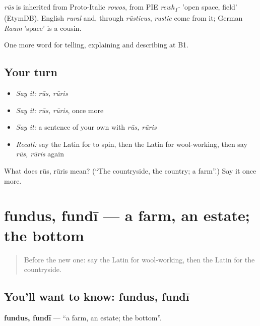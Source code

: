\begin{cousinweb}
\emph{rūs} is inherited from Proto-Italic \emph{rowos}, from PIE \emph{rewh\textsubscript{1}-} 'open space, field' (EtymDB). English \emph{rural} and, through \emph{rūsticus}, \emph{rustic} come from it; German \emph{Raum} 'space' is a cousin.
\end{cousinweb}

\begin{grammarlens}[title={What you've built}]
One more word for telling, explaining and describing at B1.
\end{grammarlens}

\subsection*{Your turn}
\begin{itemize}
\raggedright
  \item \emph{Say it:} \emph{rūs, rūris}
  \item \emph{Say it:} \emph{rūs, rūris}, once more
  \item \emph{Say it:} a sentence of your own with \emph{rūs, rūris}
  \item \emph{Recall:} say the Latin for to spin, then the Latin for wool-working, then say \emph{rūs, rūris} again
\end{itemize}

\begin{tcolorbox}[breakable,colback=teal!4,colframe=teal!35!black,title={Before you move on}]
What does rūs, rūris mean? (\textquotedblleft{}The countryside, the country; a farm\textquotedblright{}.) Say it once more.
\end{tcolorbox}
\section[fundus, fundī]{fundus, fundī — a farm, an estate; the bottom}

\label{lesson:LA-C473-fundus}



\begin{quote}
Before the new one: say the Latin for wool-working, then the Latin for the countryside.
\end{quote}

\subsection*{You'll want to know: fundus, fundī}
\textbf{fundus, fundī} — \textquotedblleft{}a farm, an estate; the bottom\textquotedblright{}.

